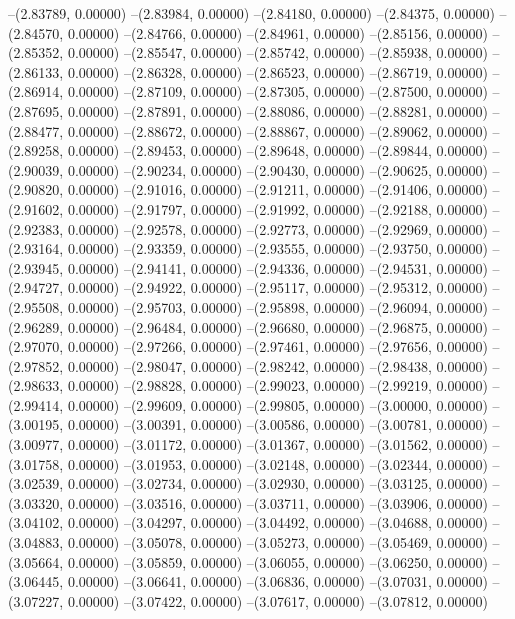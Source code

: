 --(2.83789, 0.00000)
--(2.83984, 0.00000)
--(2.84180, 0.00000)
--(2.84375, 0.00000)
--(2.84570, 0.00000)
--(2.84766, 0.00000)
--(2.84961, 0.00000)
--(2.85156, 0.00000)
--(2.85352, 0.00000)
--(2.85547, 0.00000)
--(2.85742, 0.00000)
--(2.85938, 0.00000)
--(2.86133, 0.00000)
--(2.86328, 0.00000)
--(2.86523, 0.00000)
--(2.86719, 0.00000)
--(2.86914, 0.00000)
--(2.87109, 0.00000)
--(2.87305, 0.00000)
--(2.87500, 0.00000)
--(2.87695, 0.00000)
--(2.87891, 0.00000)
--(2.88086, 0.00000)
--(2.88281, 0.00000)
--(2.88477, 0.00000)
--(2.88672, 0.00000)
--(2.88867, 0.00000)
--(2.89062, 0.00000)
--(2.89258, 0.00000)
--(2.89453, 0.00000)
--(2.89648, 0.00000)
--(2.89844, 0.00000)
--(2.90039, 0.00000)
--(2.90234, 0.00000)
--(2.90430, 0.00000)
--(2.90625, 0.00000)
--(2.90820, 0.00000)
--(2.91016, 0.00000)
--(2.91211, 0.00000)
--(2.91406, 0.00000)
--(2.91602, 0.00000)
--(2.91797, 0.00000)
--(2.91992, 0.00000)
--(2.92188, 0.00000)
--(2.92383, 0.00000)
--(2.92578, 0.00000)
--(2.92773, 0.00000)
--(2.92969, 0.00000)
--(2.93164, 0.00000)
--(2.93359, 0.00000)
--(2.93555, 0.00000)
--(2.93750, 0.00000)
--(2.93945, 0.00000)
--(2.94141, 0.00000)
--(2.94336, 0.00000)
--(2.94531, 0.00000)
--(2.94727, 0.00000)
--(2.94922, 0.00000)
--(2.95117, 0.00000)
--(2.95312, 0.00000)
--(2.95508, 0.00000)
--(2.95703, 0.00000)
--(2.95898, 0.00000)
--(2.96094, 0.00000)
--(2.96289, 0.00000)
--(2.96484, 0.00000)
--(2.96680, 0.00000)
--(2.96875, 0.00000)
--(2.97070, 0.00000)
--(2.97266, 0.00000)
--(2.97461, 0.00000)
--(2.97656, 0.00000)
--(2.97852, 0.00000)
--(2.98047, 0.00000)
--(2.98242, 0.00000)
--(2.98438, 0.00000)
--(2.98633, 0.00000)
--(2.98828, 0.00000)
--(2.99023, 0.00000)
--(2.99219, 0.00000)
--(2.99414, 0.00000)
--(2.99609, 0.00000)
--(2.99805, 0.00000)
--(3.00000, 0.00000)
--(3.00195, 0.00000)
--(3.00391, 0.00000)
--(3.00586, 0.00000)
--(3.00781, 0.00000)
--(3.00977, 0.00000)
--(3.01172, 0.00000)
--(3.01367, 0.00000)
--(3.01562, 0.00000)
--(3.01758, 0.00000)
--(3.01953, 0.00000)
--(3.02148, 0.00000)
--(3.02344, 0.00000)
--(3.02539, 0.00000)
--(3.02734, 0.00000)
--(3.02930, 0.00000)
--(3.03125, 0.00000)
--(3.03320, 0.00000)
--(3.03516, 0.00000)
--(3.03711, 0.00000)
--(3.03906, 0.00000)
--(3.04102, 0.00000)
--(3.04297, 0.00000)
--(3.04492, 0.00000)
--(3.04688, 0.00000)
--(3.04883, 0.00000)
--(3.05078, 0.00000)
--(3.05273, 0.00000)
--(3.05469, 0.00000)
--(3.05664, 0.00000)
--(3.05859, 0.00000)
--(3.06055, 0.00000)
--(3.06250, 0.00000)
--(3.06445, 0.00000)
--(3.06641, 0.00000)
--(3.06836, 0.00000)
--(3.07031, 0.00000)
--(3.07227, 0.00000)
--(3.07422, 0.00000)
--(3.07617, 0.00000)
--(3.07812, 0.00000)
